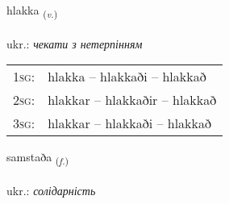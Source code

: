 \documentclass[frontgrid, backgrid]{flacards}\usepackage[]{graphicx}\usepackage[]{xcolor}
\begin{document}
\renewcommand{\flhead}{\vskip5pt \fboxsep=0pt {\small\bfseries\footnotesize Sagnorð | дієслово}}
\renewcommand{\fcfoot}{\vskip5pt \fboxsep=0pt \hspace{2pt}{\small\bfseries\footnotesize 3K}}

\renewcommand{\blhead}{\vskip5pt {\small\bfseries\footnotesize Sagnorð | дієслово }}
\renewcommand{\bcfoot}{\vskip5pt \hspace{2pt}{\small\bfseries\footnotesize 3K}}


{hlakka \small{\textsubscript{(\textit{v.})}} \\[1ex] %
\textphonetic{[l̥ahka]} \\
ukr.: \emph{чекати з нетерпінням} \\  [2ex]
\renewcommand*{\arraystretch}{0.8}
\begin{tabular}{p{1cm}l}
\textsc{1sg}: & hlakka -- hlakkaði -- hlakkað \\ 
\textsc{2sg}: & hlakkar -- hlakkaðir -- hlakkað \\ 
\textsc{3sg}: & hlakkar -- hlakkaði -- hlakkað \\ 
\end{tabular}
}

\renewcommand{\flhead}{\vskip5pt \fboxsep=0pt {\small\bfseries\footnotesize Nafnorð | іменник}}
\renewcommand{\fcfoot}{\vskip5pt \fboxsep=0pt \hspace{2pt}{\small\bfseries\footnotesize 3K}}

\renewcommand{\blhead}{\vskip5pt {\small\bfseries\footnotesize Nafnorð | іменник }}
\renewcommand{\bcfoot}{\vskip5pt \hspace{2pt}{\small\bfseries\footnotesize 3K}}


{samstaða \small{\textsubscript{(\textit{f.})}} \\[1ex] %
\textphonetic{[samstaða]} \\
ukr.: \emph{солідарність} \\  [2ex]
\renewcommand*{\arraystretch}{0.8}
}
\end{document}
